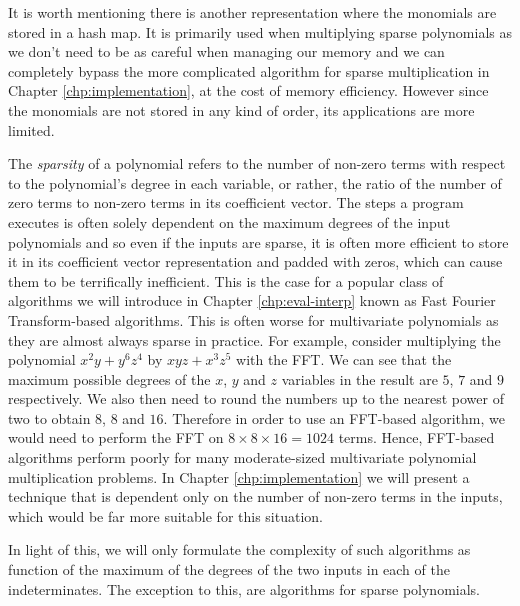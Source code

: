 It is worth mentioning there is another representation where the monomials are stored in a hash map. It is primarily used when multiplying sparse polynomials as we don't need to be as careful when managing our memory and we can completely bypass the more complicated algorithm for sparse multiplication in Chapter \ref{chp:implementation}, at the cost of memory efficiency. However since the monomials are not stored in any kind of order, its applications are more limited.

The \emph{sparsity} of a polynomial refers to the number of non-zero terms with respect to the polynomial's degree in each variable, or rather, the ratio of the number of zero terms to non-zero terms in its coefficient vector. The steps a program executes is often solely dependent on the maximum degrees of the input polynomials and so even if the inputs are sparse, it is often more efficient to store it in its coefficient vector representation and padded with zeros, which can cause them to be terrifically inefficient. This is the case for a popular class of algorithms we will introduce in Chapter \ref{chp:eval-interp} known as Fast Fourier Transform-based algorithms. This is often worse for multivariate polynomials as they are almost always sparse in practice. For example, consider multiplying the polynomial $x^2y + y^6z^4$ by $xyz + x^3z^5$ with the FFT. We can see that the maximum possible degrees of the $x$, $y$ and $z$ variables in the result  are $5$, $7$ and $9$ respectively. We also then need to round the numbers up to the nearest power of two to obtain $8$, $8$ and $16$. Therefore in order to use an FFT-based algorithm, we would need to perform the FFT on $8 \times 8 \times 16 = 1024$ terms. Hence, FFT-based algorithms perform poorly for many moderate-sized multivariate polynomial multiplication problems. In Chapter \ref{chp:implementation} we will present a technique that is dependent only on the number of non-zero terms in the inputs, which would be far more suitable for this situation.

In light of this, we will only formulate the complexity of such algorithms as function of the maximum of the degrees of the two inputs in each of the indeterminates. The exception to this, are algorithms for sparse polynomials.
